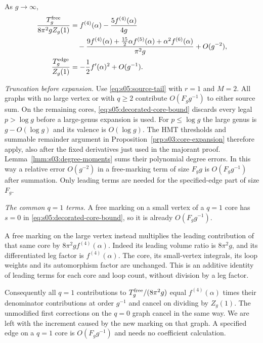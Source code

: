 \begin{lmm}\label{lmm:s05:single-source}
As $g\to\infty$,
\begin{align}
 \frac{T_g^{\rm free}}{8\pi^2gZ_g(1)}
 &=f^{(4)}(\alpha)-\frac{5f^{(4)}(\alpha)}{4g}\notag\\
 &\quad-\frac{9f^{(4)}(\alpha)
          +\tfrac{15}{2}\alpha f^{(5)}(\alpha)
          +\alpha^2 f^{(6)}(\alpha)}{\pi^2g}
          +O(g^{-2}),
 \label{eq:s05:free-ratio}\\
 \frac{T_g^{\rm edge}}{Z_g(1)}
 &=-\frac12 f'(\alpha)^2+O(g^{-1}).
 \label{eq:s05:edge-ratio}
\end{align}
\end{lmm}
\begin{prf}
\emph{Truncation before expansion.}
Use \eqref{eq:s05:source-tail} with $r=1$ and $M=2$.
All graphs with no large vertex or with $q\geq2$ contribute
$O(F_g g^{-1})$ to either source sum. On the remaining cores,
\eqref{eq:s05:decorated-core-bound} discards every legal
$p>\log g$ before a large-genus expansion is used. For
$p\leq\log g$ the large genus is $g-O(\log g)$ and its valence is
$O(\log g)$. The HMT thresholds and summable remainder argument in
Proposition~\ref{prp:s03:core-expansion} therefore apply, also after
the fixed derivatives just used in the majorant proof.
Lemma~\ref{lmm:s03:degree-moments} sums their polynomial degree
errors. In this way a relative error $O(g^{-2})$ in a free-marking
term of size $F_g g$ is $O(F_g g^{-1})$ after summation. Only leading
terms are needed for the specified-edge part of size $F_g$.

\emph{The common $q=1$ terms.}
A free marking on a small vertex of a $q=1$ core has $s=0$ in
\eqref{eq:s05:decorated-core-bound}, so it is already
$O(F_g g^{-1})$.

A free marking on the large vertex instead
multiplies the leading contribution of that same core by
$8\pi^2g f^{(4)}(\alpha)$. Indeed its leading volume ratio is
$8\pi^2g$, and its differentiated leg factor is
$f^{(4)}(\alpha)$. The core, its small-vertex integrals, its
loop weights and its automorphism factor are unchanged.
This is an additive identity of leading terms for each core and
loop count, without division by a leg factor.

Consequently all
$q=1$ contributions to $T_g^{\rm free}/(8\pi^2g)$ equal
$f^{(4)}(\alpha)$ times their denominator contributions at order
$g^{-1}$ and cancel on dividing by $Z_g(1)$. The unmodified
first corrections on the $q=0$ graph cancel in the same way.
We are left with the increment caused by the new marking on that
graph. A specified edge on a $q=1$ core is
$O(F_g g^{-1})$ and needs no coefficient calculation.


\end{prf}
